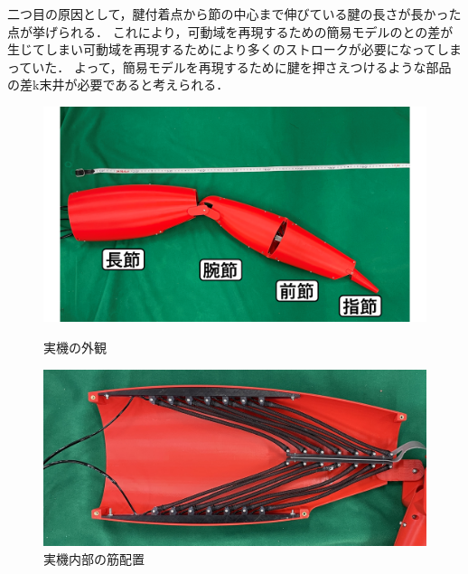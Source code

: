 \documentclass{jarticle}
\begin{document}
二つ目の原因として，腱付着点から節の中心まで伸びている腱の長さが長かった点が挙げられる．
これにより，可動域を再現するための簡易モデルのとの差が生じてしまい可動域を再現するためにより多くのストロークが必要になってしまっていた．
よって，簡易モデルを再現するために腱を押さえつけるような部品の差k末井が必要であると考えられる．

\begin{figure}[!t]
  \begin{minipage}[b]{0.47\columnwidth}
    \centering
    \includegraphics[scale=0.1]{image/jikki.png}
    \vspace{-2mm}
    \caption{実機の外観}
    \label{fig:jikki}
  \end{minipage}
  \hspace{0.04\columnwidth}
  \begin{minipage}[b]{0.47\columnwidth}
    \centering
    \includegraphics[scale=0.03]{image/crabmuscle.jpg}
    \vspace{1mm}
    \caption{実機内部の筋配置}
    \label{fig:muscle}
  \end{minipage}
\end{figure}
\end{document}
